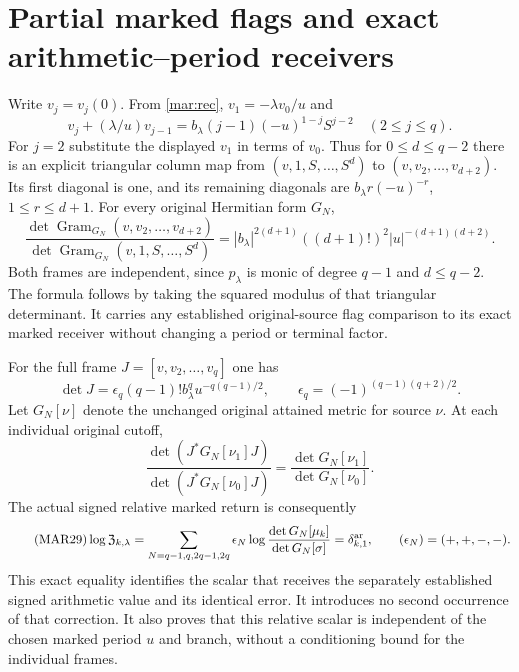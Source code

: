 \documentclass[11pt]{article}
\begin{document}
\section{Partial marked flags and exact arithmetic--period receivers}
Write $v_j=v_j(0)$. From \eqref{mar:rec},
$v_1=-\lambda v_0/u$ and
\[
 v_j+(\lambda/u)v_{j-1}=b_\lambda(j-1)(-u)^{1-j}S^{j-2}
           \quad(2\le j\le q).
\]
For $j=2$ substitute the displayed $v_1$ in terms of $v_0$.
Thus for $0\le d\le q-2$ there is an explicit triangular
column map from $(v,1,S,\ldots,S^d)$ to
$(v,v_2,\ldots,v_{d+2})$. Its first diagonal is one, and its
remaining diagonals are $b_\lambda r(-u)^{-r}$,
$1\le r\le d+1$. For every original Hermitian form $G_N$,
\begin{equation}\tag{MAR27}\label{mar:partialgram}
 \frac{\det\operatorname{Gram}_{G_N}(v,v_2,\ldots,v_{d+2})}
      {\det\operatorname{Gram}_{G_N}(v,1,S,\ldots,S^d)}
 =|b_\lambda|^{2(d+1)}((d+1)!)^2|u|^{-(d+1)(d+2)}.
\end{equation}
Both frames are independent, since $p_\lambda$ is monic of
degree $q-1$ and $d\le q-2$. The formula follows by taking
the squared modulus of that triangular determinant. It carries
any established original-source flag comparison to its exact
marked receiver without changing a period or terminal factor.

For the full frame $J=[v,v_2,\ldots,v_q]$ one has
\[
 \det J=\epsilon_q(q-1)!b_\lambda^q u^{-q(q-1)/2},\qquad
 \epsilon_q=(-1)^{(q-1)(q+2)/2}.
\]
Let $G_N[\nu]$ denote the unchanged original attained metric for
source $\nu$. At each individual original cutoff,
\begin{equation}\tag{MAR28}\label{mar:relative}
 \frac{\det(J^*G_N[\nu_1]J)}{\det(J^*G_N[\nu_0]J)}
       =\frac{\det G_N[\nu_1]}{\det G_N[\nu_0]}.
\end{equation}
The actual signed relative marked return is consequently
\begin{equation}\tag{MAR29}\label{mar:Z}
 \log\mathfrak Z_{k,\lambda}
 =\sum_{N=q-1,q,2q-1,2q}\epsilon_N
       \log\frac{\det G_N[\mu_k]}{\det G_N[\sigma]}
 =\delta_{k,1}^{\rm ar},\qquad(\epsilon_N)=(+,+,-,-).
\end{equation}
This exact equality identifies the scalar that receives the
separately established signed arithmetic value and its identical
error. It introduces no second occurrence of that correction.
It also proves that this relative scalar is independent of the
chosen marked period $u$ and branch, without a conditioning bound
for the individual frames.
\end{document}
